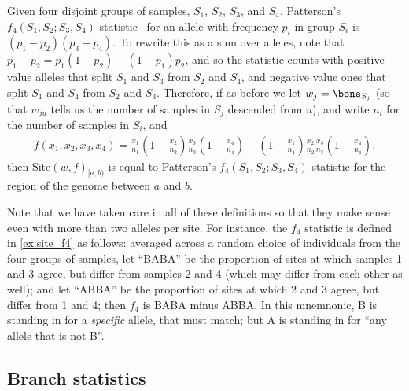 \documentclass{article}
\newcommand{\site}{\mbox{Site}} %
\newcommand{\iw}{w} %
\begin{document}
\begin{example}[Patterson's $f_4$] \label{ex:site_f4}
    Given four disjoint groups of samples, $S_1$, $S_2$, $S_3$, and $S_4$,
    Patterson's $f_4(S_1, S_2; S_3, S_4)$
    statistic~\citep{reich2009reconstructing,patterson2012ancient}
    for an allele with frequency $p_i$ in group $S_i$
    is $(p_1 - p_2)(p_3 - p_4)$. To rewrite this as a sum over alleles, note that
    $p_1 - p_2 = p_1 (1 - p_2) - (1 - p_1) p_2$,
    and so the statistic counts with positive value
    alleles that split $S_1$ and $S_3$ from $S_2$ and $S_4$,
    and negative value ones that split $S_1$ and $S_4$ from $S_2$ and $S_3$.
    Therefore, if as before we
    let $\iw_j = \bone_{S_j}$
    (so that $\iw_{ju}$ tells us the number of samples in $S_j$ descended from $u$),
    and write $n_i$ for the number of samples in $S_i$, and
    \begin{align*}
        f(x_1, x_2, x_3, x_4)
        =
        \frac{x_1}{n_1}
        \left(1 - \frac{x_2}{n_2}\right)
        \frac{x_3}{n_3}
        \left(1 - \frac{x_4}{n_4}\right)
        -
        \left(1 - \frac{x_1}{n_1}\right)
        \frac{x_2}{n_2}
        \frac{x_3}{n_3}
        \left(1 - \frac{x_4}{n_4}\right),
    \end{align*}
    then $\site(\iw, f)_{[a,b)}$ is equal to Patterson's $f_4(S_1, S_2; S_3, S_4)$ statistic
    for the region of the genome between $a$ and $b$.
\end{example}

Note that we have taken care in all of these definitions
so that they make sense even with more than two alleles per site.
For instance, the $f_4$ statistic is defined in \autoref{ex:site_f4} as follows:
averaged across a random choice of individuals from the four groups of samples,
let ``BABA'' be the proportion of sites at which samples 1 and 3 agree,
but differ from samples 2 and 4 (which may differ from each other as well);
and let ``ABBA'' be the proportion of sites at which 2 and 3 agree, but differ from 1 and 4;
then $f_4$ is BABA minus ABBA.
In this mnemnonic, B is standing in for a \emph{specific} allele, that must match;
but A is standing in for ``any allele that is not B''.


\subsection*{Branch statistics}
\end{document}
